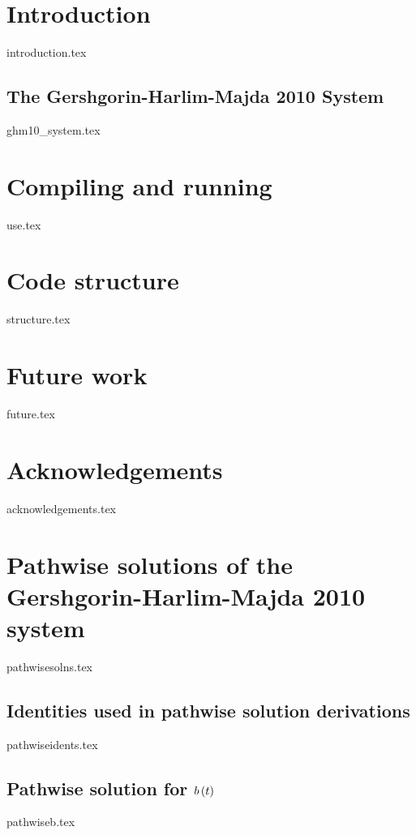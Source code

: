 \documentclass[letterpaper, 12pt]{article}
\begin{document}
\heading

\newpage

\tableofcontents

\newpage

\section{Introduction}
    {introduction.tex}
    \subsection{The Gershgorin-Harlim-Majda 2010 System} \label{sub:GHM10_system}
    	{ghm10_system.tex}
    
\section{Compiling and running}
	{use.tex}

\section{Code structure}
	{structure.tex}
	
\section{Future work}
	{future.tex}

\section*{Acknowledgements}
	{acknowledgements.tex}
    
\newpage
    
\clearpage
{}



\appendix
	\section{Pathwise solutions of the Gershgorin-Harlim-Majda 2010 system} \label{app:pathwise_solns}
		{pathwisesolns.tex}
		\subsection{Identities used in pathwise solution derivations}
			{pathwiseidents.tex}
		\subsection{Pathwise solution for $b \left( t \right)$} \label{app:pathwise_b}
			{pathwiseb.tex}
\end{document}
